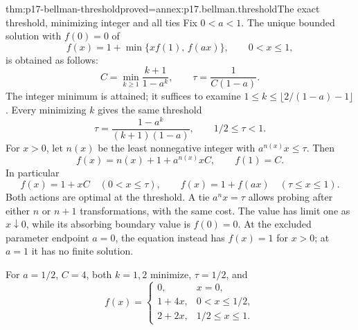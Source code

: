 \begin{hbtheorem}{thm:p17-bellman-threshold}{proved=annex:p17.bellman.threshold}{The exact threshold, minimizing integer and all ties}
Fix \(0<a<1\). The unique bounded solution with \(f(0)=0\) of
\[
                   f(x)=1+\min\{x f(1),\,f(ax)\},
                                    \qquad 0<x\leq1,
\]
is obtained as follows:
\[
 C=\min_{k\geq1}\frac{k+1}{1-a^k},\qquad
 \tau=\frac1{C(1-a)}.
\]
The integer minimum is attained; it suffices to examine
\(1\leq k\leq\lfloor2/(1-a)-1\rfloor\).
Every minimizing \(k\) gives the same threshold
\[
                 \tau=\frac{1-a^k}{(k+1)(1-a)},\qquad 1/2\leq\tau<1.
\]
For \(x>0\), let \(n(x)\) be the least nonnegative integer
with \(a^{n(x)}x\leq\tau\). Then
\[
                f(x)=n(x)+1+a^{n(x)}x C,\qquad f(1)=C.
\]
In particular
\[
 f(x)=1+xC\quad(0<x\leq\tau),\qquad
 f(x)=1+f(ax)\quad(\tau\leq x\leq1).
\]
Both actions are optimal at the threshold. A tie
\(a^n x=\tau\) allows probing after either \(n\) or \(n+1\)
transformations, with the same cost.
The value has limit one as \(x\downarrow0\), while its
absorbing boundary value is \(f(0)=0\).
At the excluded parameter endpoint \(a=0\), the equation
instead has \(f(x)=1\) for \(x>0\); at \(a=1\) it has
no finite solution.

For \(a=1/2\), \(C=4\), both \(k=1,2\) minimize,
\(\tau=1/2\), and
\[
 f(x)=\begin{cases}
 0,&x=0,\\
 1+4x,&0<x\leq1/2,\\
 2+2x,&1/2\leq x\leq1.
 \end{cases}
\]
\end{hbtheorem}
